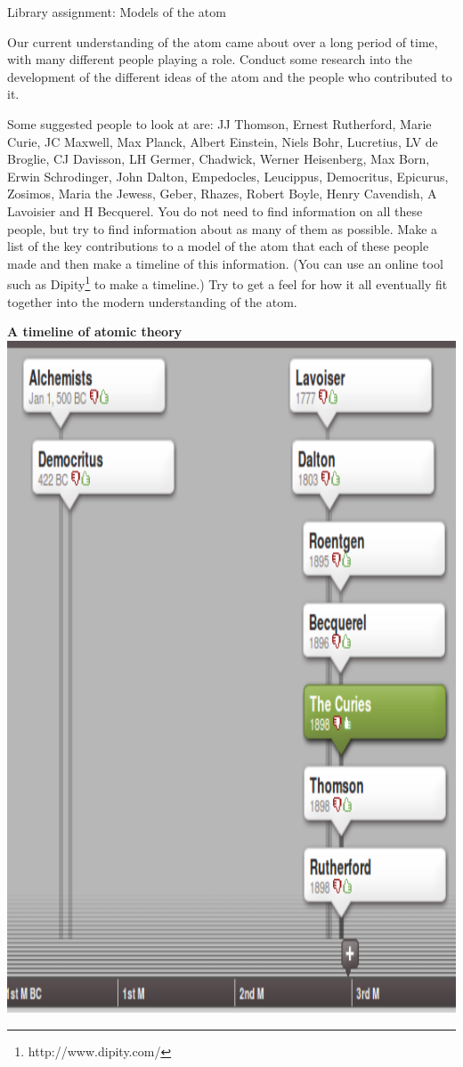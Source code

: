             \begin{project}{Library assignment: Models of the atom}
            \nopagebreak
            \label{m38756*eip-3}

Our current understanding of the atom came about over a long period of time, with many different people playing a role. Conduct some research into the development of the different ideas of the atom and the people who contributed to it.\\ \newline
\begin{minipage}{.6\textwidth}
Some suggested people to look at are: JJ Thomson, Ernest Rutherford, Marie Curie, JC Maxwell, Max Planck, Albert Einstein, Niels Bohr, Lucretius, LV de Broglie, CJ Davisson, LH Germer, Chadwick, Werner Heisenberg, Max Born, Erwin Schrodinger, John Dalton, Empedocles, Leucippus, Democritus, Epicurus, Zosimos, Maria the Jewess, Geber, Rhazes, Robert Boyle, Henry Cavendish, A Lavoisier and H Becquerel. You do not need to find information on all these people, but try to find information about as many of them as possible.
\label{m38756*id7342}Make a list of the key contributions to a model of the atom that each of these people made and then make a timeline of this information. (You can use an online tool such as Dipity\footnote{http://www.dipity.com/}
         to make a timeline.) Try to get a feel for how it all eventually fit together into the modern understanding of the atom. 
\end{minipage}
\begin{minipage}{.4\textwidth}
 \begin{center}
\textbf{A timeline of atomic theory}
  \includegraphics[height=1.2\textwidth]{photos/timeline_atom.png}
 \end{center}


\end{minipage}
\end{project}
